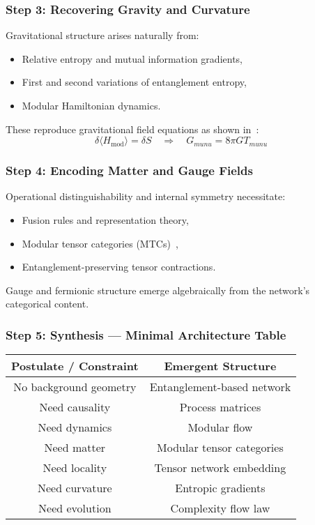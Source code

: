 \documentclass[11pt]{article}
\def\mu{mu}
\def\nu{nu}
\begin{document}
\subsubsection*{Step 3: Recovering Gravity and Curvature}

Gravitational structure arises naturally from:
\begin{itemize}
    \item Relative entropy and mutual information gradients,
    \item First and second variations of entanglement entropy,
    \item Modular Hamiltonian dynamics.
\end{itemize}

These reproduce gravitational field equations as shown in~\cite{jacobson2016entanglement,faulkner2014grav}:
\begin{equation}
\delta \langle H_{\text{mod}} \rangle = \delta S \quad \Rightarrow \quad G_{\mu\nu} = 8\pi G T_{\mu\nu}
\end{equation}

\subsubsection*{Step 4: Encoding Matter and Gauge Fields}

Operational distinguishability and internal symmetry necessitate:
\begin{itemize}
    \item Fusion rules and representation theory,
    \item Modular tensor categories (MTCs)~\cite{kitaev2006anyons,levin2005string,kong2014anyon},
    \item Entanglement-preserving tensor contractions.
\end{itemize}

Gauge and fermionic structure emerge algebraically from the network’s categorical content.

\subsubsection*{Step 5: Synthesis — Minimal Architecture Table}

\begin{center}
\begin{tabular}{|c|c|}
\hline
\textbf{Postulate / Constraint} & \textbf{Emergent Structure} \\
\hline
No background geometry & Entanglement-based network \\
Need causality & Process matrices \\
Need dynamics & Modular flow \\
Need matter & Modular tensor categories \\
Need locality & Tensor network embedding \\
Need curvature & Entropic gradients \\
Need evolution & Complexity flow law \\
\hline
\end{tabular}
\end{center}
\end{document}

